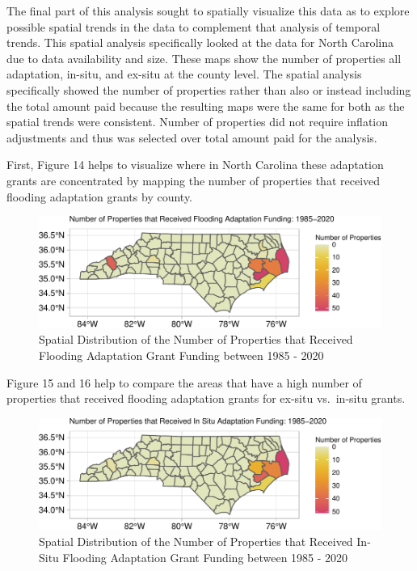 \documentclass[
  12pt,
]{article}
\begin{document}
The final part of this analysis sought to spatially visualize this data
as to explore possible spatial trends in the data to complement that
analysis of temporal trends. This spatial analysis specifically looked
at the data for North Carolina due to data availability and size. These
maps show the number of properties all adaptation, in-situ, and ex-situ
at the county level. The spatial analysis specifically showed the number
of properties rather than also or instead including the total amount
paid because the resulting maps were the same for both as the spatial
trends were consistent. Number of properties did not require inflation
adjustments and thus was selected over total amount paid for the
analysis.

First, Figure 14 helps to visualize where in North Carolina these
adaptation grants are concentrated by mapping the number of properties
that received flooding adaptation grants by county.

\begin{figure}
\centering
\includegraphics{finalreport_files/figure-latex/unnamed-chunk-25-1.pdf}
\caption{Spatial Distribution of the Number of Properties that Received
Flooding Adaptation Grant Funding between 1985 - 2020}
\end{figure}

Figure 15 and 16 help to compare the areas that have a high number of
properties that received flooding adaptation grants for ex-situ
vs.~in-situ grants.

\begin{figure}
\centering
\includegraphics{finalreport_files/figure-latex/unnamed-chunk-26-1.pdf}
\caption{Spatial Distribution of the Number of Properties that Received
In-Situ Flooding Adaptation Grant Funding between 1985 - 2020}
\end{figure}
\end{document}
